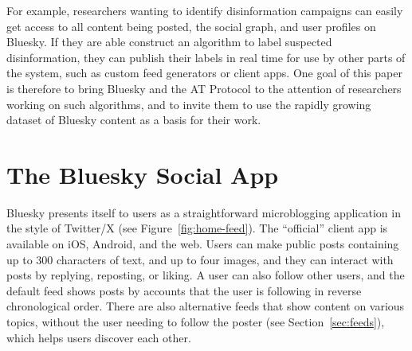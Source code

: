 \documentclass[sigconf,review]{acmart}
\begin{document}
For example, researchers wanting to identify disinformation campaigns can easily get access to all content being posted, the social graph, and user profiles on Bluesky.
If they are able construct an algorithm to label suspected disinformation, they can publish their labels in real time for use by other parts of the system, such as custom feed generators or client apps.
One goal of this paper is therefore to bring Bluesky and the AT Protocol to the attention of researchers working on such algorithms, and to invite them to use the rapidly growing dataset of Bluesky content as a basis for their work.

\section{The Bluesky Social App}\label{sec:product}

Bluesky presents itself to users as a straightforward microblogging application in the style of Twitter/X (see Figure~\ref{fig:home-feed}).
The ``official'' client app is available on iOS, Android, and the web.
Users can make public posts containing up to 300 characters of text, and up to four images, and they can interact with posts by replying, reposting, or liking.
A user can also follow other users, and the default feed shows posts by accounts that the user is following in reverse chronological order.
There are also alternative feeds that show content on various topics, without the user needing to follow the poster (see Section~\ref{sec:feeds}), which helps users discover each other.
\end{document}
